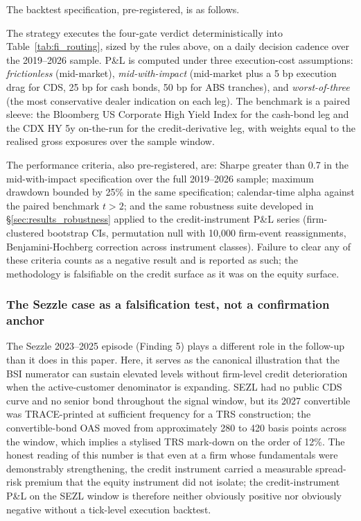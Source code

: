 \documentclass[11pt,a4paper]{article}
\begin{document}
The backtest specification, pre-registered, is as follows.

The strategy executes the four-gate verdict deterministically into Table~\ref{tab:fi_routing}, sized by the rules above, on a daily decision cadence over the 2019--2026 sample. P\&L is computed under three execution-cost assumptions: \emph{frictionless} (mid-market), \emph{mid-with-impact} (mid-market plus a 5 bp execution drag for CDS, 25 bp for cash bonds, 50 bp for ABS tranches), and \emph{worst-of-three} (the most conservative dealer indication on each leg). The benchmark is a paired sleeve: the Bloomberg US Corporate High Yield Index for the cash-bond leg and the CDX HY 5y on-the-run for the credit-derivative leg, with weights equal to the realised gross exposures over the sample window.

The performance criteria, also pre-registered, are: Sharpe greater than 0.7 in the mid-with-impact specification over the full 2019--2026 sample; maximum drawdown bounded by 25\% in the same specification; calendar-time alpha against the paired benchmark $t > 2$; and the same robustness suite developed in §\ref{sec:results_robustness} applied to the credit-instrument P\&L series (firm-clustered bootstrap CIs, permutation null with 10{,}000 firm-event reassignments, Benjamini-Hochberg correction across instrument classes). Failure to clear any of these criteria counts as a negative result and is reported as such; the methodology is falsifiable on the credit surface as it was on the equity surface.

\subsubsection{The Sezzle case as a falsification test, not a confirmation anchor}

The Sezzle 2023--2025 episode (Finding 5) plays a different role in the follow-up than it does in this paper. Here, it serves as the canonical illustration that the BSI numerator can sustain elevated levels without firm-level credit deterioration when the active-customer denominator is expanding. SEZL had no public CDS curve and no senior bond throughout the signal window, but its 2027 convertible was TRACE-printed at sufficient frequency for a TRS construction; the convertible-bond OAS moved from approximately 280 to 420 basis points across the window, which implies a stylised TRS mark-down on the order of 12\%. The honest reading of this number is that even at a firm whose fundamentals were demonstrably strengthening, the credit instrument carried a measurable spread-risk premium that the equity instrument did not isolate; the credit-instrument P\&L on the SEZL window is therefore neither obviously positive nor obviously negative without a tick-level execution backtest.
\end{document}
